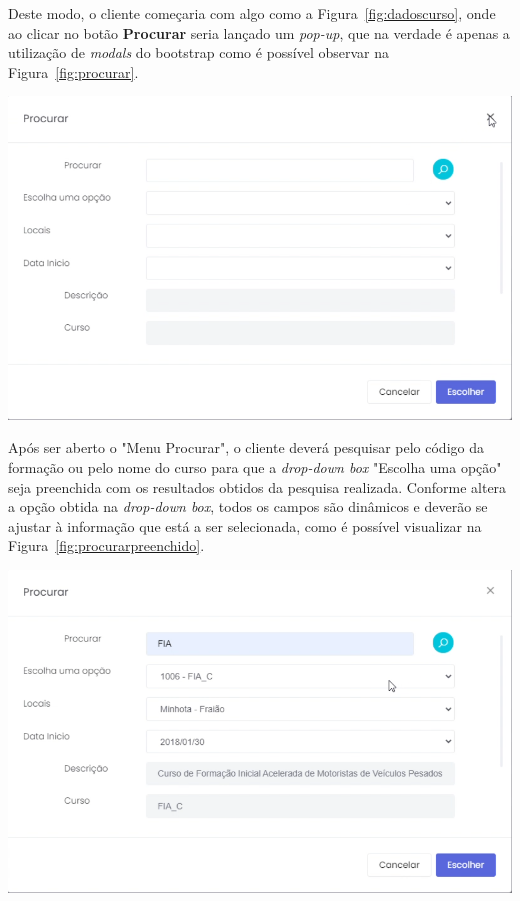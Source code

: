 Deste modo, o cliente começaria com algo como a Figura~\ref{fig:dadoscurso}, onde ao clicar no botão \textbf{Procurar} seria lançado um \textit{pop-up}, que na verdade é apenas a utilização de \textit{modals} do \gls{bootstrap} como é possível observar na Figura~\ref{fig:procurar}.

\begin{center}
        \includegraphics[width=\textwidth,height=\textheight,keepaspectratio]{images/procurar.png}
        \label{fig:procurar}
\end{center}

Após ser aberto o "Menu Procurar", o cliente deverá pesquisar pelo código da formação ou pelo nome do curso para que a \textit{drop-down box} "Escolha uma opção" seja preenchida com os resultados obtidos da pesquisa realizada. Conforme altera a opção obtida na \textit{drop-down box}, todos os campos são dinâmicos e deverão se ajustar à informação que está a ser selecionada, como é possível visualizar na Figura~\ref{fig:procurarpreenchido}.

\begin{center}
        \includegraphics[width=\textwidth,height=\textheight,keepaspectratio]{images/procurardados.png}
        \label{fig:procurarpreenchido}
\end{center}


